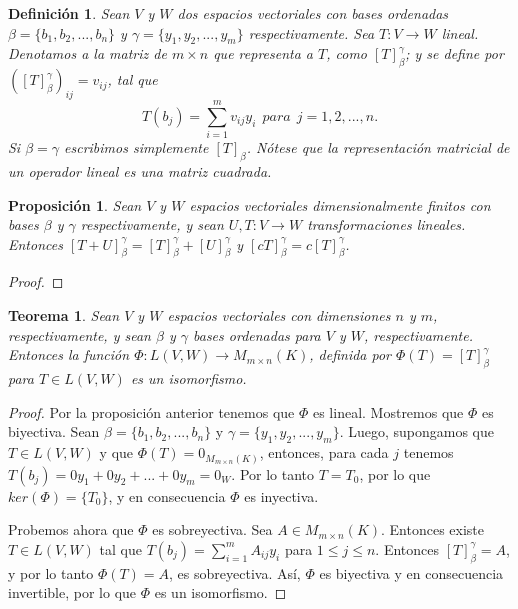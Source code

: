 \documentclass{book}
\newtheorem{theorem}{Teorema}
\newtheorem{proposition}{Proposición}
\newtheorem{definition}{Definición}
\begin{document}
\begin{definition}
Sean $V$ y $W$ dos espacios vectoriales con bases ordenadas $\beta=\{b_1,b_2,...,b_n\}$ y $\gamma=\{y_1,y_2,...,y_m\}$ respectivamente. Sea $T:V \rightarrow W$ lineal. Denotamos a la matriz de $m\times n$ que representa a $T$, como $[T]_{\beta} ^{\gamma}$; y se define por $([T]_{\beta} ^{\gamma})_{ij}=v_{ij}$, tal que
\[
T(b_j)=\sum_{i=1}^{m}v_{ij}y_i \ \ para \ \ j=1,2,...,n.
\]
Si $\beta=\gamma$ escribimos simplemente $[T]_{\beta}$. Nótese que la representación matricial de un operador lineal es una matriz cuadrada.
\end{definition}

\begin{proposition}
Sean $V$ y $W$ espacios vectoriales dimensionalmente finitos con bases $\beta$ y $\gamma$ respectivamente, y sean $U,T:V \rightarrow W$ transformaciones lineales. Entonces $[T+U]_{\beta} ^{\gamma}=[T]_{\beta} ^{\gamma} +[U]_{\beta} ^{\gamma}$ y $[cT]_{\beta} ^{\gamma} = c[T]_{\beta} ^{\gamma}$.
\end{proposition}

\begin{proof}

\end{proof} 

\begin{theorem}
Sean $V$ y $W$ espacios vectoriales con dimensiones $n$ y $m$, respectivamente, y sean $\beta$ y $\gamma$ bases ordenadas para $V$ y $W$, respectivamente. Entonces la función $\Phi:L(V,W)\rightarrow M_{m\times n}(K)$, definida por $\Phi (T)=[T]_{\beta} ^{\gamma}$ para $T\in L(V,W)$ es un isomorfismo.
\end{theorem}

\begin{proof}
Por la proposición anterior tenemos que $\Phi$ es lineal. Mostremos que $\Phi$ es biyectiva. Sean $\beta=\{b_1,b_2,...,b_n\}$ y $\gamma=\{y_1,y_2,...,y_m\}$. Luego, supongamos que $T\in L(V,W)$ y que $\Phi (T)=0_{M_{m\times n}(K)}$, entonces, para cada $j$ tenemos $T(b_j)=0y_1+0y_2+...+0y_m=0_W$. Por lo tanto $T=T_0$, por lo que $ker(\Phi)=\{T_0\}$, y en consecuencia $\Phi$ es inyectiva. 

Probemos ahora que $\Phi$ es sobreyectiva. 	Sea $A\in M_{m\times n}(K)$. Entonces existe $T\in L(V,W)$ tal que $T(b_j)=\sum_{i=1}^{m}A_{ij}y_{i}$ para $1\leq j\leq n$. Entonces $[T]_{\beta} ^{\gamma}=A$, y por lo tanto $\Phi(T)=A$, es sobreyectiva. Así, $\Phi$ es biyectiva y en consecuencia invertible, por lo que $\Phi$ es un isomorfismo.
\end{proof}
\end{document}

